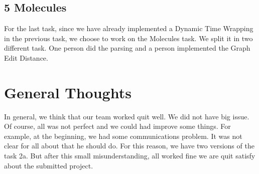 \documentclass[12pt]{article}
\begin{document}
\subsection*{5 Molecules}
For the last task, since we have already implemented a Dynamic Time Wrapping in the previous task, we choose to work on the Molecules task. We split it in two different task. One person did the parsing and a person implemented the Graph Edit Distance. 

\section*{General Thoughts}
In general, we think that our team worked quit well. We did not have big issue. Of course, all was not perfect and we could had improve some things. For example, at the beginning, we had some communications problem. It was not clear for all about that he should do. For this reason, we have two versions of the task 2a. But after this small misunderstanding, all worked fine we are quit satisfy about the submitted project.
\end{document}
